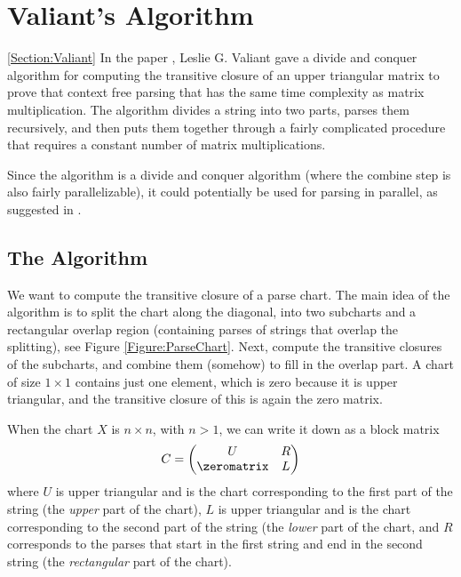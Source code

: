 \section{Valiant's Algorithm}
\ref{Section:Valiant}
In the paper \cite{Valiant}, Leslie G. Valiant gave a divide and conquer algorithm for computing the transitive closure of an upper triangular matrix to prove that context free parsing that has the same time complexity as matrix multiplication. The algorithm divides a string into two parts, parses them recursively, and then puts them together through a fairly complicated procedure that requires a constant number of matrix multiplications.

Since the algorithm is a divide and conquer algorithm (where the combine step is also fairly parallelizable), it could potentially be used for parsing in parallel, as suggested in \cite{JP-PP}.

\subsection{The Algorithm}
We want to compute the transitive closure of a parse chart. The main idea of the algorithm is to split the chart along the diagonal, into two subcharts and a rectangular overlap region (containing parses of strings that overlap the splitting), see Figure \ref{Figure:ParseChart}. Next, compute the transitive closures of the subcharts, and combine them (somehow) to fill in the overlap part. A chart of size $1 \times 1$ contains just one element, which is zero because it is upper triangular, and the transitive closure of this is again the zero matrix.

\label{Section:Subdivision-in-Specification}
When the chart $X$ is $n \times n$, with $n > 1$, we can write it down as a block matrix 
\begin{equation*}
  C = 
  \begin{pmatrix}
    U & R \\
    \zeromatrix & L
  \end{pmatrix}
\end{equation*}
where $U$ is upper triangular and is the chart corresponding to the first part of the string (the \emph{upper} part of the chart), $L$ is upper triangular and is the chart corresponding to the second part of the string (the \emph{lower} part of the chart, and $R$ corresponds to the parses that start in the first string and end in the second string (the \emph{rectangular} part of the chart).

